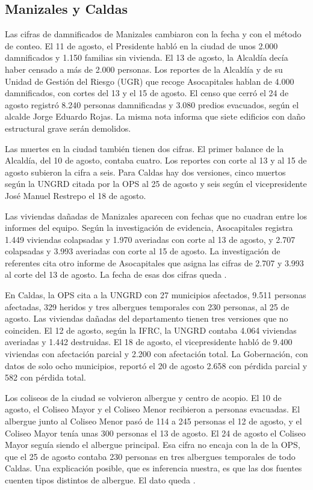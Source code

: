 \subsection{Manizales y Caldas}

Las cifras de damnificados de Manizales cambiaron con la fecha y con el método de conteo. El 11 de agosto, el Presidente habló en la ciudad de unos 2.000 damnificados y 1.150 familias sin vivienda. El 13 de agosto, la Alcaldía decía haber censado a más de 2.000 personas. Los reportes de la Alcaldía y de su Unidad de Gestión del Riesgo (UGR) que recoge Asocapitales hablan de 4.000 damnificados, con cortes del 13 y el 15 de agosto. El censo que cerró el 24 de agosto registró 8.240 personas damnificadas y 3.080 predios evacuados, según el alcalde Jorge Eduardo Rojas. La misma nota informa que siete edificios con daño estructural grave serán demolidos.

Las muertes en la ciudad también tienen dos cifras. El primer balance de la Alcaldía, del 10 de agosto, contaba cuatro. Los reportes con corte al 13 y al 15 de agosto subieron la cifra a seis. Para Caldas hay dos versiones, cinco muertos según la UNGRD citada por la OPS al 25 de agosto y seis según el vicepresidente José Manuel Restrepo el 18 de agosto.

Las viviendas dañadas de Manizales aparecen con fechas que no cuadran entre los informes del equipo. Según la investigación de evidencia, Asocapitales registra 1.449 viviendas colapsadas y 1.970 averiadas con corte al 13 de agosto, y 2.707 colapsadas y 3.993 averiadas con corte al 15 de agosto. La investigación de referentes cita otro informe de Asocapitales que asigna las cifras de 2.707 y 3.993 al corte del 13 de agosto. La fecha de esas dos cifras queda \porverificar.

En Caldas, la OPS cita a la UNGRD con 27 municipios afectados, 9.511 personas afectadas, 329 heridos y tres albergues temporales con 230 personas, al 25 de agosto. Las viviendas dañadas del departamento tienen tres versiones que no coinciden. El 12 de agosto, según la IFRC, la UNGRD contaba 4.064 viviendas averiadas y 1.442 destruidas. El 18 de agosto, el vicepresidente habló de 9.400 viviendas con afectación parcial y 2.200 con afectación total. La Gobernación, con datos de solo ocho municipios, reportó el 20 de agosto 2.658 con pérdida parcial y 582 con pérdida total.

Los coliseos de la ciudad se volvieron albergue y centro de acopio. El 10 de agosto, el Coliseo Mayor y el Coliseo Menor recibieron a personas evacuadas. El albergue junto al Coliseo Menor pasó de 114 a 245 personas el 12 de agosto, y el Coliseo Mayor tenía unas 300 personas el 13 de agosto. El 24 de agosto el Coliseo Mayor seguía siendo el albergue principal. Esa cifra no encaja con la de la OPS, que el 25 de agosto contaba 230 personas en tres albergues temporales de todo Caldas. Una explicación posible, que es inferencia nuestra, es que las dos fuentes cuenten tipos distintos de albergue. El dato queda \porverificar.

